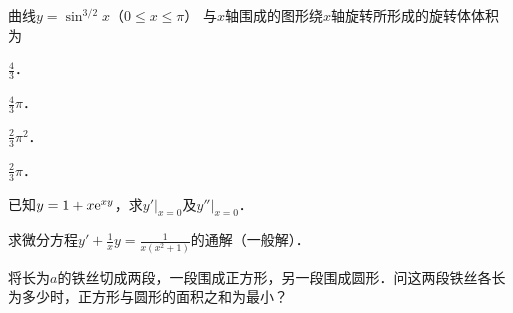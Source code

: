 \documentclass[plain,noanswer,medmath]{../../template/jnuexam}
\begin{document}


\begin{problem}
曲线$y=\sin^{3/2} x$（$0\le x\le \pi$）
与$x$轴围成的图形绕$x$轴旋转所形成的旋转体体积为\pickout{}
\begin{abcd}
\item $\frac{4}{3}$．          
\item $\frac{4}{3}\pi$．         
\item $\frac{2}{3}\pi^2$．      
\item $\frac{2}{3}\pi$．
\end{abcd}
\end{problem}








\begin{problem}
已知$y=1+x\mathrm{e}^{xy}$，求$y'|_{x=0}$及$y''|_{x=0}$．
\end{problem}


\begin{problem}
求微分方程$y'+\frac{1}{x}y=\frac{1}{x(x^2+1)}$的通解（一般解）．
\end{problem}






\begin{problem}
将长为$a$的铁丝切成两段，一段围成正方形，另一段围成圆形．问这两段铁丝各长为多少时，正方形与圆形的面积之和为最小？
\end{problem}
\end{document}
